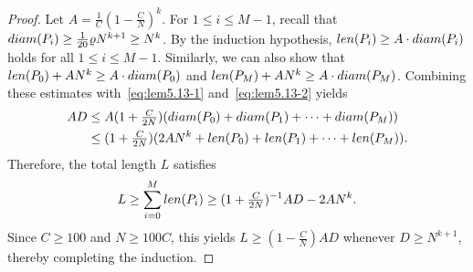 \documentclass[10pt,a4paper]{amsart}
\begin{document}
\begin{proof}
    Let $A = \frac{1}{C} (1 - \frac{C}{N})^k$. For $1 \leq i \leq M-1$, recall that ${\rm diam}(P_i) \geq \frac{1}{20} \varrho N^{k+1} \geq N^k$. By the induction hypothesis, ${\rm len}(P_i) \geq A \cdot {\rm diam}(P_i)$ holds for all $1 \leq i \leq M - 1$. Similarly, we can also show that ${\rm len}(P_0) + A N^k \geq A \cdot {\rm diam}(P_0)$ and ${\rm len}(P_M) + A N^k \geq A \cdot {\rm diam}(P_M)$. Combining these estimates with~\eqref{eq:lem5.13-1} and~\eqref{eq:lem5.13-2} yields
    \begin{align*}
        AD &\leq A (1 + \tfrac{C}{2N}) ({\rm diam}(P_0) + {\rm diam}(P_1) + \cdots +  {\rm diam}(P_M)) \\
        &\leq (1 + \tfrac{C}{2N}) (2A N^k + {\rm len}(P_0) + {\rm len}(P_1) + \cdots +  {\rm len}(P_M)).
    \end{align*}
    Therefore, the total length $L$ satisfies
    \[ L \geq \sum_{i=0}^M {\rm len}(P_i) \geq (1 + \tfrac{C}{2N})^{-1} AD - 2A N^k. \]
    Since $C \geq 100$ and $N \geq 100C$, this yields $L \ge (1 - \frac{C}{N}) A D$ whenever $D \geq N^{k+1}$, thereby completing the induction.
\end{proof}
\end{document}
